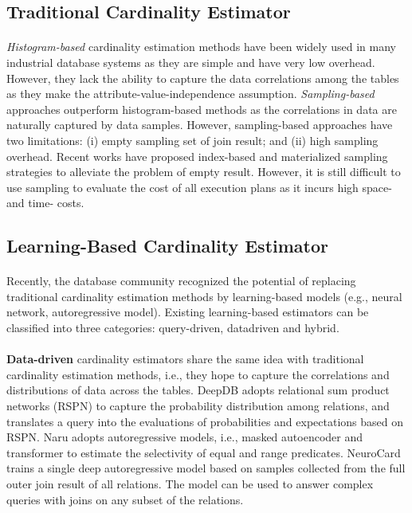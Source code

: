     \subsection{Traditional Cardinality Estimator}
    \paragraph{}
    \emph{Histogram-based} cardinality estimation methods\cite{Self-Tuning-Histograms} have been widely used in many 
    industrial database systems as they are simple and have very low overhead. However, they lack the ability to capture 
    the data correlations among the tables as they make the attribute-value-independence assumption. 
    \emph{Sampling-based} approaches\cite{Two-Level-Sampling} outperform histogram-based methods as the correlations 
    in data are naturally captured by data samples. However, sampling-based approaches have two limitations: (i) empty 
    sampling set of join result; and (ii) high sampling overhead. Recent works have proposed index-based and 
    materialized sampling strategies to alleviate the problem of empty result. However, it is still difficult to use 
    sampling to evaluate the cost of all execution plans as it incurs high space- and time- costs.
    
    \subsection{Learning-Based Cardinality Estimator}
    \paragraph{}
    Recently, the database community recognized the potential of replacing traditional cardinality estimation methods 
    by learning-based models (e.g., neural network, autoregressive model)\cite{Lan2021ASO}. Existing learning-based 
    estimators can be classified into three categories: query-driven, datadriven and hybrid.
    \paragraph{}
    \textbf{Data-driven} cardinality estimators\cite{yang2019deep, yang2020neurocard} share the same idea with traditional 
    cardinality estimation methods, i.e., they hope to capture the correlations and distributions of data across the 
    tables. DeepDB\cite{yang2019deep} adopts relational sum product networks (RSPN) to capture the probability 
    distribution among relations, and translates a query into the evaluations of probabilities and expectations based 
    on RSPN. Naru\cite{naru2019} adopts autoregressive models, i.e., masked autoencoder and transformer to estimate 
    the selectivity of equal and range predicates. NeuroCard\cite{yang2020neurocard} trains a single deep autoregressive 
    model based on samples collected from the full outer join result of all relations. The model can be used to answer 
    complex queries with joins on any subset of the relations. 
